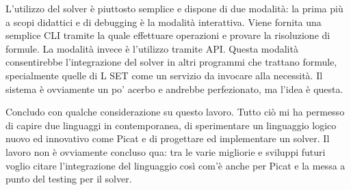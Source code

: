 \documentclass[11pt]{article}
\begin{document}
L'utilizzo del solver è piuttosto semplice e dispone di due modalità:
la prima più a scopi didattici e di debugging è la modalità
interattiva. Viene fornita una semplice CLI tramite la quale
effettuare operazioni e provare la risoluzione di formule. La modalità
invece è l'utilizzo tramite API. Questa modalità consentirebbe
l'integrazione del solver in altri programmi che trattano formule,
specialmente quelle di L SET come un servizio da invocare alla
necessità. Il sistema è ovviamente un po' acerbo e andrebbe
perfezionato, ma l'idea è questa.

Concludo con qualche considerazione su questo lavoro. Tutto ciò mi ha
permesso di capire due linguaggi in contemporanea, di sperimentare un
linguaggio logico nuovo ed innovativo come Picat e di progettare ed
implementare un solver. Il lavoro non è ovviamente concluso qua: tra
le varie migliorie e sviluppi futuri voglio citare l'integrazione del
linguaggio \lset{} così com'è anche per Picat e la messa a punto del
testing per il solver.
\end{document}
